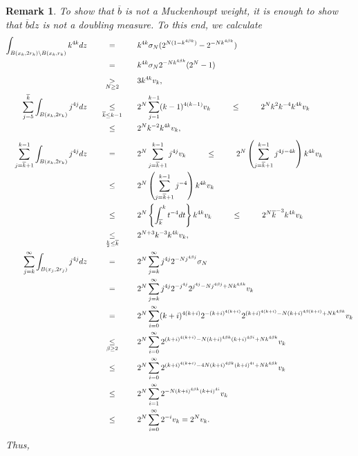 \documentclass[11pt, a4paper]{article}
\newtheorem{remark}{Remark}%
\numberwithin{equation}{section}
\newcommand{\coex}[2][\hphantom{longexplanation}]{%
  \underset{{#1}}{\overset{\hphantom{longexplanation}}{#2}}
}
\begin{document}
\begin{remark}
To show that $\overline{b}$ is not a Muckenhoupt weight, it is enough
to show that $\overline{b} dz$ is not a doubling measure. To this end,
we calculate 
\begin{align*}
  \int_{B(x_{k},2r_{k})\setminus B(x_{k},r_{k})} k^{4k}dz
  &\coex{=} k^{4k}\sigma_{N}(2^{N(1-k^{4\beta k})}-2^{-Nk^{4\beta
    k}})\\
  &\coex{=} k^{4k}
    \sigma _{N}2^{-Nk^{4\beta k}}(2^{N}-1)  \\
  &\coex[N\ge 2]{>}3k^{4k}v_{k},\\
  \sum_{j=5}^{\overline{k}}\int_{B(x_{k},2r_{k})}j^{4j}dz
  &\coex[\overline{k}\le k-1]{\le}
    2^{N}\sum_{j=1}^{k-1}(k-1)^{4(k-1)}v_{k}
  \coex{\le} 2^{N}k^2k^{-4}k^{4k}v_{k}\\
  &\coex{\le} 2^{N}k^{-2}k^{4k}v_{k},\\
  \sum_{j=\overline{k}+1}^{k-1}\int_{B(x_{k},2r_{k})}j^{4j}dz
  &\coex{=} 2^{N} \sum_{j=\overline{k}+1}^{k-1}j^{4j}v_{k}
  \coex{\le} 2^{N}
    \left(\sum_{j=\overline{k}+1}^{k-1}j^{4j-4k} \right)k^{4k}v_{k}\\
  &\coex{\le} 2^{N} \left(\sum_{j=\overline{k}+1}^{k-1}j^{-4}
    \right)k^{4k}v_{k}\\
    &\coex{\le} 2^{N} \left\{\int_{\overline{k}}^{k}
    t^{-4}dt\right\} k^{4k}v_{k}
    \coex{\le} 2^{N} \overline{k}^{-3}k^{4k}v_{k} \\
  &\coex[\frac{k}{2}\le \overline{k}]{\le} 2^{N+3}k^{-3}k^{4k}v_{k},\\
  \sum_{j=k}^{\infty}\int_{B(x_{j},2r_{j})}j^{4j}dz
  &\coex{=} 2^{N}\sum_{j=k}^{\infty}j^{4j}2^{-Nj^{4\beta j}}\sigma_{N}\\
    &\coex{=}
      2^{N}\sum_{j=k}^{\infty}j^{4j}2^{-j^{4j}}2^{j^{4j}-Nj^{4\beta
      j}+Nk^{4\beta k}}v_{k}\\
  &\coex{=}
    2^{N}\sum_{i=0}^{\infty}(k+i)^{4(k+i)}2^{-(k+i)^{4(k+i)}}2^{(k+i)^{4(k+i)}-N(k+i)^{4\beta
    (k+i)}+Nk^{4\beta k}}v_{k}\\
  &\coex[\beta\ge 2]{\le}
    2^{N}\sum_{i=0}^{\infty}2^{(k+i)^{4(k+i)}-N(k+i)^{4\beta k}(k+i)^{4
    \beta i}+Nk^{4\beta k}}v_{k}\\
  &\coex{\le}
    2^{N}\sum_{i=0}^{\infty}2^{(k+i)^{4(k+i)}-4N(k+i)^{4\beta
    k}(k+i)^{4i}+Nk^{4\beta k}}v_{k}\\
  &\coex{\le}
    2^{N}\sum_{i=1}^{\infty}2^{-N(k+i)^{4\beta k}(k+i)^{4i}}v_{k}\\
  &\coex{\le} 2^{N}\sum_{i=0}^{\infty}2^{-i}v_{k}= 2^{N}v_{k}.
\end{align*}
Thus,

\end{remark}
\end{document}
